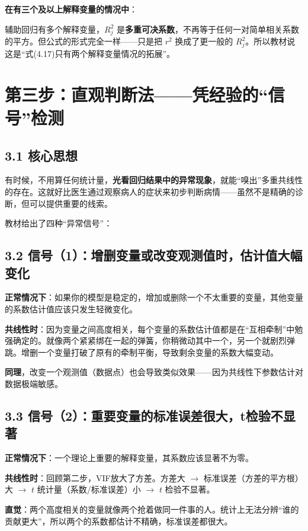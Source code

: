\documentclass[12pt,a4paper]{ctexart}
\begin{document}
\textbf{在有三个及以上解释变量的情况中}：

辅助回归有多个解释变量，$R_j^2$ 是\textbf{多重可决系数}，不再等于任何一对简单相关系数的平方。但公式的形式完全一样——只是把 $r^2$ 换成了更一般的 $R_j^2$。所以教材说这是“式(4.17)只有两个解释变量情况的拓展”。

\section*{第三步：直观判断法——凭经验的“信号”检测}

\subsection*{3.1 核心思想}

有时候，不用算任何统计量，\textbf{光看回归结果中的异常现象}，就能“嗅出”多重共线性的存在。这就好比医生通过观察病人的症状来初步判断病情——虽然不是精确的诊断，但可以提供重要的线索。

教材给出了四种“异常信号”：

\subsection*{3.2 信号（1）：增删变量或改变观测值时，估计值大幅变化}

\textbf{正常情况下}：如果你的模型是稳定的，增加或删除一个不太重要的变量，其他变量的系数估计值应该只发生轻微变化。

\textbf{共线性时}：因为变量之间高度相关，每个变量的系数估计值都是在“互相牵制”中勉强确定的。就像两个紧紧绑在一起的弹簧，你稍微动其中一个，另一个就剧烈弹跳。增删一个变量打破了原有的牵制平衡，导致剩余变量的系数大幅变动。

\textbf{同理}，改变一个观测值（数据点）也会导致类似效果——因为共线性下参数估计对数据极端敏感。

\subsection*{3.3 信号（2）：重要变量的标准误差很大，t检验不显著}

\textbf{正常情况下}：一个理论上重要的解释变量，其系数应该显著不为零。

\textbf{共线性时}：回顾第二步，VIF放大了方差。方差大 $\rightarrow$ 标准误差（方差的平方根）大 $\rightarrow$ $t$ 统计量（系数/标准误差）小 $\rightarrow$ $t$ 检验不显著。

\textbf{直觉}：两个高度相关的变量就像两个抢着做同一件事的人。统计上无法分辨“谁的贡献更大”，所以两个的系数都估计不精确，标准误差都很大。
\end{document}
